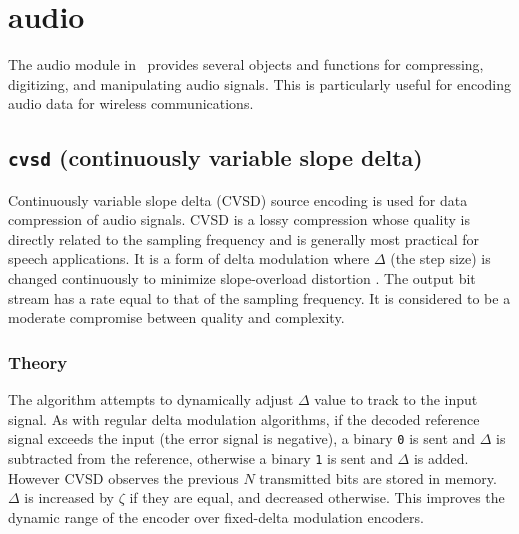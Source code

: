 % 
%

\newpage
\section{audio}
\label{module:audio}
The audio module in \liquid\ provides several objects and functions for
compressing, digitizing, and manipulating audio signals.
This is particularly useful for encoding audio data for wireless
communications.

\subsection{{\tt cvsd} (continuously variable slope delta)}
\label{module:audio:cvsd}
Continuously variable slope delta (CVSD) source encoding is used for data
compression of audio signals.
CVSD is a lossy compression whose quality is directly related to the sampling
frequency and is generally most practical for speech applications.
It is a form of delta modulation where $\Delta$ (the step size) is changed
continuously to minimize slope-overload distortion \cite[p. 131]{Proakis:2001}.
The output bit stream has a rate equal to that of the sampling frequency.
It is considered to be a moderate compromise between quality and complexity.

\subsubsection{Theory}
\label{module:audio:cvsd:theory}
The algorithm attempts to dynamically adjust $\Delta$ value to track
to the input signal.
As with regular delta modulation algorithms,
if the decoded reference signal exceeds the input (the error signal is
negative), a binary {\tt 0} is sent and $\Delta$ is subtracted from the
reference, otherwise a binary {\tt 1} is sent and $\Delta$ is added.
However CVSD observes the previous $N$ transmitted bits are stored in memory.
$\Delta$ is increased by $\zeta$ if they are equal, and decreased otherwise.
This improves the dynamic range of the encoder over fixed-delta modulation
encoders.


